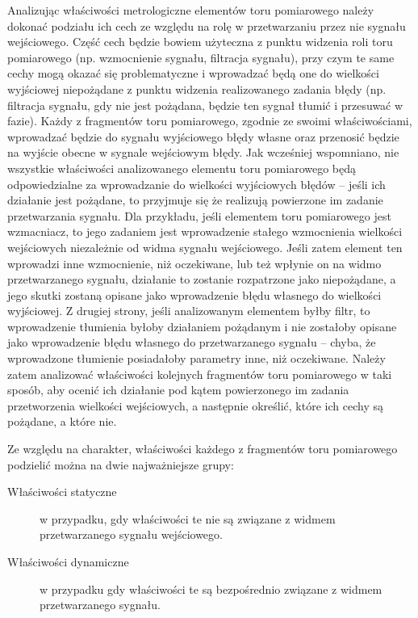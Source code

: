 Analizując właściwości metrologiczne elementów toru pomiarowego należy dokonać podziału ich cech ze względu na rolę w przetwarzaniu przez nie sygnału wejściowego. Część cech będzie bowiem użyteczna z punktu widzenia roli toru pomiarowego (np. wzmocnienie sygnału, filtracja sygnału), przy czym te same cechy mogą okazać się problematyczne i wprowadzać będą one do wielkości wyjściowej niepożądane z punktu widzenia realizowanego zadania błędy (np. filtracja sygnału, gdy nie jest pożądana, będzie ten sygnał tłumić i przesuwać w fazie). Każdy z fragmentów toru pomiarowego, zgodnie ze swoimi właściwościami, wprowadzać będzie do sygnału wyjściowego błędy własne oraz przenosić będzie na wyjście obecne w sygnale wejściowym błędy. Jak wcześniej wspomniano, nie wszystkie właściwości analizowanego elementu toru pomiarowego będą odpowiedzialne za wprowadzanie do wielkości wyjściowych błędów -- jeśli ich działanie jest pożądane, to przyjmuje się że realizują powierzone im zadanie przetwarzania sygnału. Dla przykładu, jeśli elementem toru pomiarowego jest wzmacniacz, to jego zadaniem jest wprowadzenie stałego wzmocnienia wielkości wejściowych niezależnie od widma sygnału wejściowego. Jeśli zatem element ten wprowadzi inne wzmocnienie, niż oczekiwane, lub też wpłynie on na widmo przetwarzanego sygnału, działanie to zostanie rozpatrzone jako niepożądane, a jego skutki zostaną opisane jako wprowadzenie błędu własnego do wielkości wyjściowej. Z drugiej strony, jeśli analizowanym elementem byłby filtr, to wprowadzenie tłumienia byłoby działaniem pożądanym i nie zostałoby opisane jako wprowadzenie błędu własnego do przetwarzanego sygnału -- chyba, że wprowadzone tłumienie posiadałoby parametry inne, niż oczekiwane. Należy zatem analizować właściwości kolejnych fragmentów toru pomiarowego w taki sposób, aby ocenić ich działanie pod kątem powierzonego im zadania przetworzenia wielkości wejściowych, a następnie określić, które ich cechy są pożądane, a które nie.

Ze względu na charakter, właściwości każdego z fragmentów toru pomiarowego podzielić można na dwie najważniejsze grupy:
\begin{description}
\item [Właściwości statyczne] w przypadku, gdy właściwości te nie są związane z widmem przetwarzanego sygnału wejściowego.
\item [Właściwości dynamiczne] w przypadku gdy właściwości te są bezpośrednio związane z widmem przetwarzanego sygnału.
\end{description}

